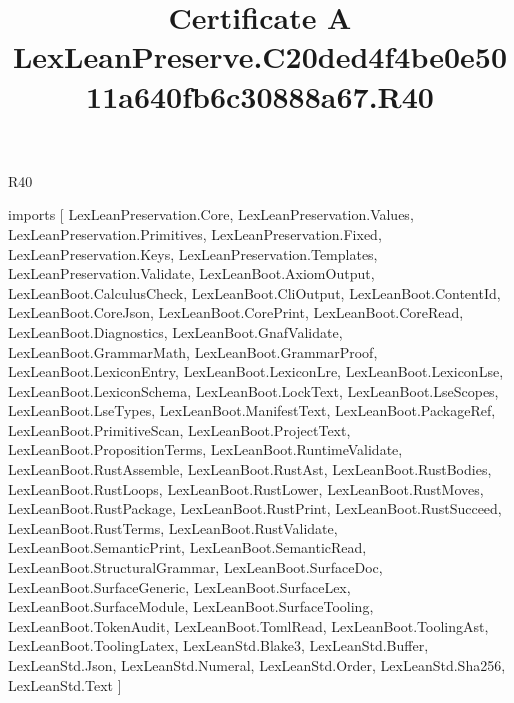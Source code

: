 \begin{lexlean}{R40}
\title{Certificate A LexLeanPreserve.C20ded4f4be0e5011a640fb6c30888a67.R40}
\begin{coremodule}
imports [
  LexLeanPreservation.Core,
  LexLeanPreservation.Values,
  LexLeanPreservation.Primitives,
  LexLeanPreservation.Fixed,
  LexLeanPreservation.Keys,
  LexLeanPreservation.Templates,
  LexLeanPreservation.Validate,
  LexLeanBoot.AxiomOutput,
  LexLeanBoot.CalculusCheck,
  LexLeanBoot.CliOutput,
  LexLeanBoot.ContentId,
  LexLeanBoot.CoreJson,
  LexLeanBoot.CorePrint,
  LexLeanBoot.CoreRead,
  LexLeanBoot.Diagnostics,
  LexLeanBoot.GnafValidate,
  LexLeanBoot.GrammarMath,
  LexLeanBoot.GrammarProof,
  LexLeanBoot.LexiconEntry,
  LexLeanBoot.LexiconLre,
  LexLeanBoot.LexiconLse,
  LexLeanBoot.LexiconSchema,
  LexLeanBoot.LockText,
  LexLeanBoot.LseScopes,
  LexLeanBoot.LseTypes,
  LexLeanBoot.ManifestText,
  LexLeanBoot.PackageRef,
  LexLeanBoot.PrimitiveScan,
  LexLeanBoot.ProjectText,
  LexLeanBoot.PropositionTerms,
  LexLeanBoot.RuntimeValidate,
  LexLeanBoot.RustAssemble,
  LexLeanBoot.RustAst,
  LexLeanBoot.RustBodies,
  LexLeanBoot.RustLoops,
  LexLeanBoot.RustLower,
  LexLeanBoot.RustMoves,
  LexLeanBoot.RustPackage,
  LexLeanBoot.RustPrint,
  LexLeanBoot.RustSucceed,
  LexLeanBoot.RustTerms,
  LexLeanBoot.RustValidate,
  LexLeanBoot.SemanticPrint,
  LexLeanBoot.SemanticRead,
  LexLeanBoot.StructuralGrammar,
  LexLeanBoot.SurfaceDoc,
  LexLeanBoot.SurfaceGeneric,
  LexLeanBoot.SurfaceLex,
  LexLeanBoot.SurfaceModule,
  LexLeanBoot.SurfaceTooling,
  LexLeanBoot.TokenAudit,
  LexLeanBoot.TomlRead,
  LexLeanBoot.ToolingAst,
  LexLeanBoot.ToolingLatex,
  LexLeanStd.Blake3,
  LexLeanStd.Buffer,
  LexLeanStd.Json,
  LexLeanStd.Numeral,
  LexLeanStd.Order,
  LexLeanStd.Sha256,
  LexLeanStd.Text
]


\end{coremodule}
\end{lexlean}
